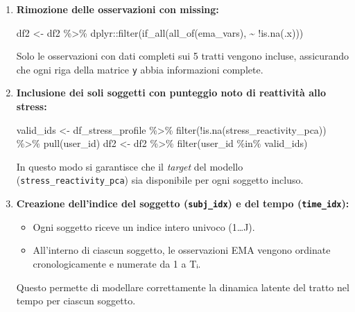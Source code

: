 \documentclass[
  11pt,
  a4paper,
  onecolumn]{article}
\newenvironment{Shaded}{}{}
\newcommand{\FunctionTok}[1]{\textcolor[rgb]{0.44,0.26,0.76}{#1}}
\newcommand{\NormalTok}[1]{\textcolor[rgb]{0.14,0.16,0.18}{#1}}
\newcommand{\OtherTok}[1]{\textcolor[rgb]{0.44,0.26,0.76}{#1}}
\newcommand{\SpecialCharTok}[1]{\textcolor[rgb]{0.00,0.36,0.77}{#1}}
\providecommand{\tightlist}{%
  \setlength{\itemsep}{0pt}\setlength{\parskip}{0pt}}
\begin{document}
\begin{enumerate}
\def\labelenumi{\arabic{enumi}.}
\item
  \textbf{Rimozione delle osservazioni con missing:}

\begin{Shaded}
\begin{Highlighting}[]
\NormalTok{df2 }\OtherTok{\textless{}{-}}\NormalTok{ df2 }\SpecialCharTok{\%\textgreater{}\%}\NormalTok{ dplyr}\SpecialCharTok{::}\FunctionTok{filter}\NormalTok{(}\FunctionTok{if\_all}\NormalTok{(}\FunctionTok{all\_of}\NormalTok{(ema\_vars), }\SpecialCharTok{\textasciitilde{}} \SpecialCharTok{!}\FunctionTok{is.na}\NormalTok{(.x)))}
\end{Highlighting}
\end{Shaded}

  Solo le osservazioni con dati completi sui 5 tratti vengono incluse,
  assicurando che ogni riga della matrice \texttt{y} abbia informazioni
  complete.
\item
  \textbf{Inclusione dei soli soggetti con punteggio noto di reattività
  allo stress:}

\begin{Shaded}
\begin{Highlighting}[]
\NormalTok{valid\_ids }\OtherTok{\textless{}{-}}\NormalTok{ df\_stress\_profile }\SpecialCharTok{\%\textgreater{}\%}
  \FunctionTok{filter}\NormalTok{(}\SpecialCharTok{!}\FunctionTok{is.na}\NormalTok{(stress\_reactivity\_pca)) }\SpecialCharTok{\%\textgreater{}\%}
  \FunctionTok{pull}\NormalTok{(user\_id)}
\NormalTok{df2 }\OtherTok{\textless{}{-}}\NormalTok{ df2 }\SpecialCharTok{\%\textgreater{}\%} \FunctionTok{filter}\NormalTok{(user\_id }\SpecialCharTok{\%in\%}\NormalTok{ valid\_ids)}
\end{Highlighting}
\end{Shaded}

  In questo modo si garantisce che il \emph{target} del modello
  (\texttt{stress\_reactivity\_pca}) sia disponibile per ogni soggetto
  incluso.
\item
  \textbf{Creazione dell'indice del soggetto (\texttt{subj\_idx}) e del
  tempo (\texttt{time\_idx}):}

  \begin{itemize}
  \tightlist
  \item
    Ogni soggetto riceve un indice intero univoco (1\ldots J).
  \item
    All'interno di ciascun soggetto, le osservazioni EMA vengono
    ordinate cronologicamente e numerate da 1 a Tᵢ.
  \end{itemize}

  Questo permette di modellare correttamente la dinamica latente del
  tratto nel tempo per ciascun soggetto.
\end{enumerate}
\end{document}
